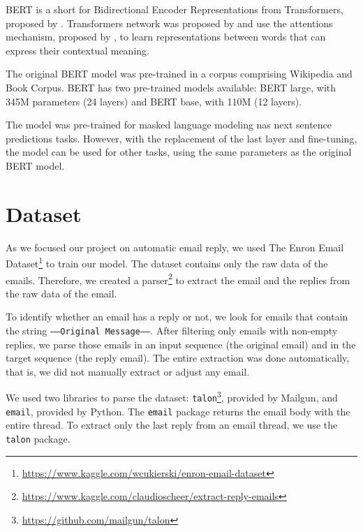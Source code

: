 \documentclass[letterpaper]{article}
\begin{document}
BERT is a short for Bidirectional Encoder Representations from Transformers, proposed by \cite{DBLP:journals/corr/abs-1810-04805}. Transformers network was proposed by \cite{DBLP:journals/corr/VaswaniSPUJGKP17} and use the attentions mechanism, proposed by \cite{DBLP:journals/corr/BahdanauCB14}, to learn representations between words that can express their contextual meaning.

The original BERT model was pre-trained in a corpus comprising Wikipedia and Book Corpus. BERT has two pre-trained models available: BERT large, with \num{345}{M} parameters (24 layers) and BERT base, with \num{110}{M} (12 layers).

The model was pre-trained for masked language modeling nas next sentence predictions tasks. However, with the replacement of the last layer and fine-tuning, the model can be used for other tasks, using the same parameters as the original BERT model.


\section{Dataset}

As we focused our project on automatic email reply, we used The Enron Email Dataset\footnote{\href{https://www.kaggle.com/wcukierski/enron-email-dataset}{https://www.kaggle.com/wcukierski/enron-email-dataset}} to train our model. The dataset contains only the raw data of the emails. Therefore, we created a parser\footnote{\href{https://www.kaggle.com/claudioscheer/extract-reply-emails}{https://www.kaggle.com/claudioscheer/extract-reply-emails}} to extract the email and the replies from the raw data of the email.

To identify whether an email has a reply or not, we look for emails that contain the string \texttt{-----Original Message-----}. After filtering only emails with non-empty replies, we parse those emails in an input sequence (the original email) and in the target sequence (the reply email). The entire extraction was done automatically, that is, we did not manually extract or adjust any email.

We used two libraries to parse the dataset: \texttt{talon}\footnote{\href{https://github.com/mailgun/talon}{https://github.com/mailgun/talon}}, provided by Mailgun, and \texttt{email}, provided by Python. The \texttt{email} package returns the email body with the entire thread. To extract only the last reply from an email thread, we use the \texttt{talon} package.
\end{document}
